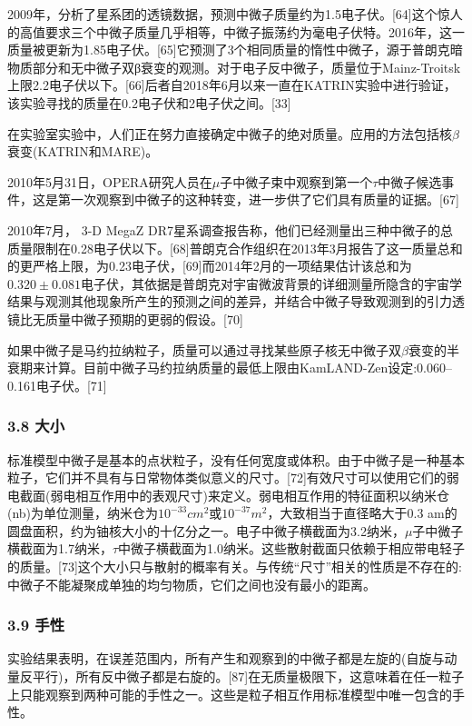 2009年，分析了星系团的透镜数据，预测中微子质量约为1.5电子伏。[64]这个惊人的高值要求三个中微子质量几乎相等，中微子振荡约为毫电子伏特。2016年，这一质量被更新为1.85电子伏。[65]它预测了3个相同质量的惰性中微子，源于普朗克暗物质部分和无中微子双β衰变的观测。对于电子反中微子，质量位于Mainz-Troitsk上限2.2电子伏以下。[66]后者自2018年6月以来一直在KATRIN实验中进行验证，该实验寻找的质量在0.2电子伏和2电子伏之间。[33]

在实验室实验中，人们正在努力直接确定中微子的绝对质量。应用的方法包括核$\beta$衰变(KATRIN和MARE)。

2010年5月31日，OPERA研究人员在$\mu$子中微子束中观察到第一个$\tau$中微子候选事件，这是第一次观察到中微子的这种转变，进一步供了它们具有质量的证据。[67]

2010年7月， 3-D MegaZ DR7星系调查报告称，他们已经测量出三种中微子的总质量限制在0.28电子伏以下。[68]普朗克合作组织在2013年3月报告了这一质量总和的更严格上限，为0.23电子伏，[69]而2014年2月的一项结果估计该总和为$0.320\pm0.081$电子伏，其依据是普朗克对宇宙微波背景的详细测量所隐含的宇宙学结果与观测其他现象所产生的预测之间的差异，并结合中微子导致观测到的引力透镜比无质量中微子预期的更弱的假设。[70]

如果中微子是马约拉纳粒子，质量可以通过寻找某些原子核无中微子双$\beta$衰变的半衰期来计算。目前中微子马约拉纳质量的最低上限由KamLAND-Zen设定:0.060–0.161电子伏。[71]

\subsubsection{3.8 大小}
标准模型中微子是基本的点状粒子，没有任何宽度或体积。由于中微子是一种基本粒子，它们并不具有与日常物体类似意义的尺寸。[72]有效尺寸可以使用它们的弱电截面(弱电相互作用中的表观尺寸)来定义。弱电相互作用的特征面积以纳米仓(nb)为单位测量，纳米仓为$10^{-33} cm^2$或$10^{-37} m^2$，大致相当于直径略大于0.3 am的圆盘面积，约为铀核大小的十亿分之一。电子中微子横截面为3.2纳米，$\mu$子中微子横截面为1.7纳米，$\tau$中微子横截面为1.0纳米。这些散射截面只依赖于相应带电轻子的质量。[73]这个大小只与散射的概率有关。与传统“尺寸”相关的性质是不存在的:中微子不能凝聚成单独的均匀物质，它们之间也没有最小的距离。

\subsubsection{3.9 手性}
实验结果表明，在误差范围内，所有产生和观察到的中微子都是左旋的(自旋与动量反平行)，所有反中微子都是右旋的。[87]在无质量极限下，这意味着在任一粒子上只能观察到两种可能的手性之一。这些是粒子相互作用标准模型中唯一包含的手性。

